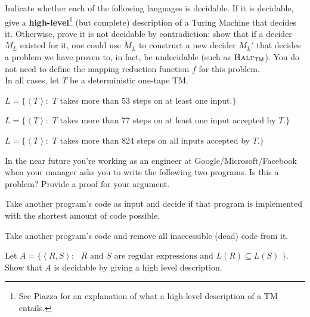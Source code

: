 \documentclass[solution, letterpaper]{cscie121}
\begin{document}


Indicate whether each of the following languages is decidable. If it is
decidable, give a \textbf{high-level}\footnote{See Piazza for an explanation of
what a high-level description of a TM entails.} (but complete) description of
a Turing Machine that decides it. Otherwise, prove it is not decidable by
contradiction: show that if a decider $M_L$ existed for it, one could use $M_L$
to construct a new decider $M_L'$ that decides a problem we have proven to, in
fact, be undecidable (such as $\textsc{Halt}_{\textsf{TM}}$). You do not need
to define the mapping reduction function $f$ for this problem.\\

\noindent In all cases, let $T$ be a deterministic one-tape TM.
 
\subproblem $L=\{\left<T\right>:$ $T$ takes more than 53 steps on at least one
input.$\}$ 

\subproblem $L=\{\left<T\right>:$ $T$ takes more than 77 steps on at least one
input accepted by $T$.$\}$

\subproblem $L=\{\left<T\right>:$ $T$ takes more than 824 steps on all inputs
accepted by $T$.$\}$

\begin{solution}
\end{solution}

In the near future you're working as an engineer at Google/Microsoft/Facebook when your manager asks you to write the following two programs. Is this a problem? Provide a proof for your argument.

\subproblem Take another program's code as input and decide if that program is implemented with the shortest amount of code possible.

\subproblem Take another program's code and remove all inaccessible (dead) code from it.

\begin{solution}
\end{solution}


Let $A=\{\left<R,S\right>: \text{ $R$ and $S$ are regular expressions
and $L(R)
\subseteq L(S)$ \}}$. Show that $A$ is decidable by giving a high level description. 

\begin{solution}
\end{solution}
\end{document}
